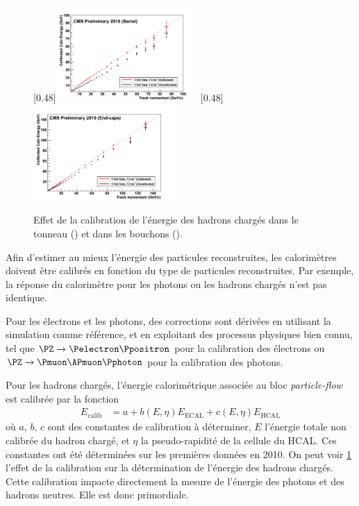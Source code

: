 \begin{figure}[tbp]
    \centering
    \subcaptionbox{\label{fig:hadron_calib_barrel}}[0.48\textwidth]{\includegraphics[width=0.48\textwidth]{chapitre3/figs/hadron_calib_barrel.png}} \hfill
    \subcaptionbox{\label{fig:hadron_calib_endcap}}[0.48\textwidth]{\includegraphics[width=0.48\textwidth]{chapitre3/figs/hadron_calib_endcap.png}}
    \caption{Effet de la calibration de l'énergie des hadrons chargés dans le tonneau () et dans les bouchons ().}
    \label{fig:hadron_calib}
\end{figure}

Afin d'estimer au mieux l'énergie des particules reconstruites, les calorimètres doivent être calibrés en fonction du type de particules reconstruites. Par exemple, la réponse du calorimètre pour les photons ou les hadrons chargés n'est pas identique.

Pour les électrons et les photons, des corrections sont dérivées en utilisant la simulation comme référence, et en exploitant des processus physiques bien connu, tel que $\PZ \rightarrow \Pelectron \Ppositron$ pour la calibration des électrons ou $\PZ \rightarrow \Pmuon \APmuon \Pphoton$ pour la calibration des photons.

Pour les hadrons chargés, l'énergie calorimétrique associée au bloc \emph{particle-flow} est calibrée par la fonction
\begin{align*}
  E_\text{calib} &= a + b\left(E, \eta\right) E_\text{ECAL} + c\left(E, \eta\right)E_\text{HCAL}
\end{align*}
où $a$, $b$, $c$ sont des constantes de calibration à déterminer, $E$ l'énergie totale non calibrée du hadron chargé, et $\eta$ la pseudo-rapidité de la cellule du HCAL. Ces constantes ont été déterminées sur les premières données en 2010. On peut voir \cref{fig:hadron_calib} l'effet de la calibration sur la détermination de l'énergie des hadrons chargés. Cette calibration impacte directement la mesure de l'énergie des photons et des hadrons neutres. Elle est donc primordiale.

